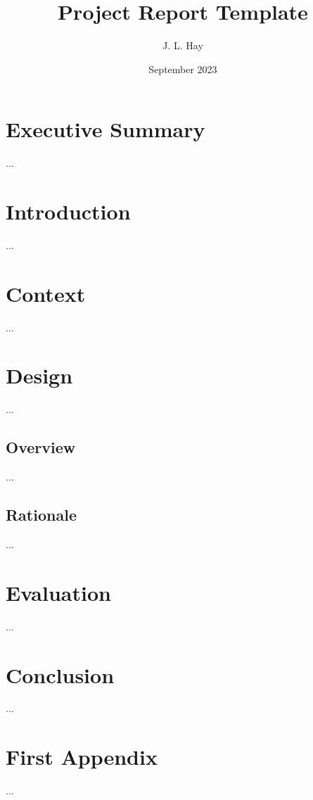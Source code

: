 \documentclass{article}
\title{Project Report Template}
\author{J. L. Hay \cite{hay22}}
\date{September 2023}
\begin{document}
\maketitle

\thispagestyle{empty}

\pagebreak



\section*{Executive Summary}
...

\pagebreak


\tableofcontents

\pagebreak


\fancyfoot[R]{\thepage/\pageref*{page:final}}

\section{Introduction}
...

\pagebreak


\section{Context}
...

\pagebreak


\section{Design}
...

\subsection{Overview}
...

\subsection{Rationale}
... 

\pagebreak


\section{Evaluation}
...

\pagebreak


\section*{Conclusion}
\label{page:final}
...

\pagebreak


\fancyfoot[R]{\thepage}

\printbibliography
{}

\pagebreak
\appendix

\section{First Appendix}
...
\end{document}
